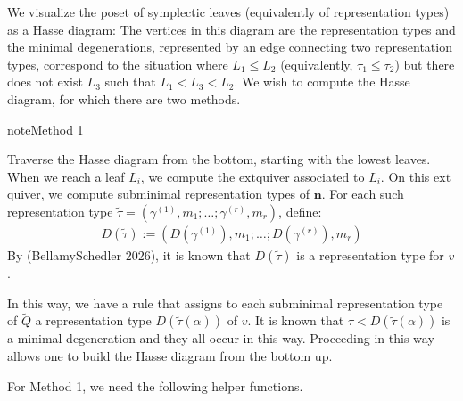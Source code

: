 \documentclass[letterpaper,10pt,english]{sphinxmanual}
\begin{document}
\sphinxAtStartPar
We visualize the poset of symplectic leaves (equivalently of representation types) as a Hasse diagram: The vertices in this diagram are the representation types and the minimal degenerations, represented by an edge connecting two representation types, correspond to the situation where \(L_1\leq L_2\) (equivalently, \(\tau_1\leq\tau_2\)) but there does not exist \(L_3\) such that \(L_1 < L_3 < L_2\). We wish to compute the Hasse diagram, for which there are two methods.

\begin{sphinxadmonition}{note}{Method 1}

\sphinxAtStartPar
Traverse the Hasse diagram from the bottom, starting with the lowest leaves. When we reach a leaf \(L_i\), we compute the \(\mathrm{ext}\)\sphinxhyphen{}quiver associated to \(L_i\). On this \(\mathrm{ext}\)\sphinxhyphen{}quiver, we compute subminimal representation types of \(\mathbf{n}\). For each such representation type \(\tilde{\tau}=(\gamma^{(1)},m_1;\dots;\gamma^{(r)},m_r)\), define:
\begin{equation*}
\begin{split}D(\tilde{\tau}):=\left(D(\gamma^{(1)}),m_1;\dots;D(\gamma^{(r)}),m_r\right)\end{split}
\end{equation*}
\sphinxAtStartPar
By (Bellamy\sphinxhyphen{}Schedler 2026), it is known that \(D(\tilde{\tau})\) is a representation type for \(v\).

\sphinxAtStartPar
In this way, we have a rule that assigns to each subminimal representation type of \(\tilde{Q}\) a representation type \(D(\tilde{\tau}(\alpha))\) of \(v\). It is known that \(\tau < D(\tilde{\tau}(\alpha))\) is a minimal degeneration and they all occur in this way. Proceeding in this way allows one to build the Hasse diagram from the bottom up.
\end{sphinxadmonition}

\sphinxAtStartPar
For Method 1, we need the following helper functions.
\end{document}
